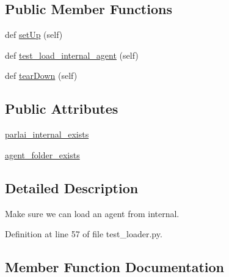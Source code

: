 \subsection*{Public Member Functions}
\begin{DoxyCompactItemize}
\item 
def \hyperlink{classtests_1_1test__loader_1_1TestLoadParlAIInternal_aa2c8dd54f74af955480e1c8c0970c7d5}{set\+Up} (self)
\item 
def \hyperlink{classtests_1_1test__loader_1_1TestLoadParlAIInternal_a93e29a3766a0f33e4ea94558b04cb05a}{test\+\_\+load\+\_\+internal\+\_\+agent} (self)
\item 
def \hyperlink{classtests_1_1test__loader_1_1TestLoadParlAIInternal_a35bb2f05c24011675c9757645f3d2818}{tear\+Down} (self)
\end{DoxyCompactItemize}
\subsection*{Public Attributes}
\begin{DoxyCompactItemize}
\item 
\hyperlink{classtests_1_1test__loader_1_1TestLoadParlAIInternal_a6c323ef04845f987b187c78f998e4906}{parlai\+\_\+internal\+\_\+exists}
\item 
\hyperlink{classtests_1_1test__loader_1_1TestLoadParlAIInternal_abd3cee140df0a6d48f20413e0aa8be2d}{agent\+\_\+folder\+\_\+exists}
\end{DoxyCompactItemize}


\subsection{Detailed Description}
\begin{DoxyVerb}Make sure we can load an agent from internal.
\end{DoxyVerb}
 

Definition at line 57 of file test\+\_\+loader.\+py.



\subsection{Member Function Documentation}
\mbox{\label{classtests_1_1test__loader_1_1TestLoadParlAIInternal_aa2c8dd54f74af955480e1c8c0970c7d5}} 
